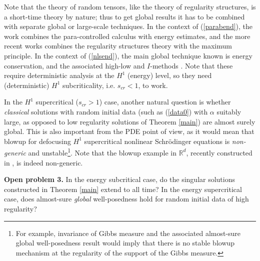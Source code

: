 \documentclass[11 pt,reqno]{amsart}
\theoremstyle{definition}
\theoremstyle{remark}
\numberwithin{equation}{section}
\newcommand{\Rb}{\mathbb{R}}
\begin{document}
{{Note that the theory of random tensors, like the theory of regularity structures, is a short-time theory by nature; thus to get global results it has to be combined with separate global or large-scale techniques. In the context of (\ref{parabend}), the work \cite{MouWe3} combines the para-controlled calculus with energy estimates, and the more recent works \cite{MoWe,CMW} combines the regularity structures theory with the maximum principle. In the context of (\ref{nlsend}), the main global technique known is energy conservation, and the associated high-low and $I$-methods \cite{Bourgain98,CLO,CKSTT,CO}. Note that these require deterministic analysis at the $H^1$ (energy) level, so they need (deterministic) $H^1$ subcriticality, i.e. $s_{cr}<1$, to work.

In the $H^1$ supercritical ($s_{cr}>1$) case, another natural question is whether \emph{classical} solutions with random initial data (such as (\ref{data0}) with $\alpha$ suitably large, as opposed to low regularity solutions of Theorem \ref{main}) are almost surely global. This is also important from the PDE point of view, as it would mean that blowup for defocusing $H^1$ supercritical nonlinear Schr\"{o}dinger equations is \emph{non-generic} and unstable\footnote{For example, invariance of Gibbs measure and the associated almost-sure global well-posedness result would imply that there is no stable blowup mechanism at the regularity of the support of the Gibbs measure.}. Note that the blowup example in $\Rb^d$, recently constructed in \cite{MRRS}, is indeed non-generic.

\textbf{Open problem 3.} In the energy subcritical case, do the singular solutions constructed in Theorem \ref{main} extend to all time? In the energy supercritical case, does almost-sure \emph{global} well-posedness hold for random initial data of high regularity?
 
}}
\end{document}
